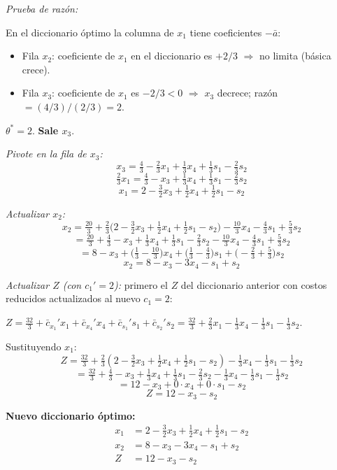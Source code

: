 \documentclass{article}
\begin{document}
\begin{enumerate}[a)]
\textit{Prueba de razón:}

En el diccionario óptimo la columna de $x_1$ tiene coeficientes $-\bar{a}$:
\begin{itemize}
  \item Fila $x_2$: coeficiente de $x_1$ en el diccionario es $+2/3$ $\Rightarrow$ no limita (básica crece).
  \item Fila $x_3$: coeficiente de $x_1$ es $-2/3<0$ $\Rightarrow$ $x_3$ decrece; razón $=(4/3)/(2/3)=2$.
\end{itemize}

$\theta^*=2$. \textbf{Sale $x_3$}.

\textit{Pivote en la fila de $x_3$:}
$$x_3=\tfrac{4}{3}-\tfrac{2}{3}x_1+\tfrac{1}{3}x_4+\tfrac{1}{3}s_1-\tfrac{2}{3}s_2$$
$$\tfrac{2}{3}x_1=\tfrac{4}{3}-x_3+\tfrac{1}{3}x_4+\tfrac{1}{3}s_1-\tfrac{2}{3}s_2$$
$$\boxed{x_1=2-\tfrac{3}{2}x_3+\tfrac{1}{2}x_4+\tfrac{1}{2}s_1-s_2}$$

\textit{Actualizar $x_2$:}
$$x_2=\tfrac{20}{3}+\tfrac{2}{3}\bigl(2-\tfrac{3}{2}x_3+\tfrac{1}{2}x_4+\tfrac{1}{2}s_1-s_2\bigr)-\tfrac{10}{3}x_4-\tfrac{4}{3}s_1+\tfrac{5}{3}s_2$$
$$=\tfrac{20}{3}+\tfrac{4}{3}-x_3+\tfrac{1}{3}x_4+\tfrac{1}{3}s_1-\tfrac{2}{3}s_2-\tfrac{10}{3}x_4-\tfrac{4}{3}s_1+\tfrac{5}{3}s_2$$
$$=8-x_3+\bigl(\tfrac{1}{3}-\tfrac{10}{3}\bigr)x_4+\bigl(\tfrac{1}{3}-\tfrac{4}{3}\bigr)s_1+\bigl(-\tfrac{2}{3}+\tfrac{5}{3}\bigr)s_2$$
$$\boxed{x_2=8-x_3-3x_4-s_1+s_2}$$

\textit{Actualizar $Z$ (con $c_1'=2$):} primero el $Z$ del diccionario anterior con costos reducidos actualizados al nuevo $c_1=2$:

$Z=\tfrac{32}{3}+\bar{c}_{x_1}'x_1+\bar{c}_{x_4}'x_4+\bar{c}_{s_1}'s_1+\bar{c}_{s_2}'s_2=\tfrac{32}{3}+\tfrac{2}{3}x_1-\tfrac{1}{3}x_4-\tfrac{1}{3}s_1-\tfrac{1}{3}s_2$.

Sustituyendo $x_1$:
$$Z=\tfrac{32}{3}+\tfrac{2}{3}(2-\tfrac{3}{2}x_3+\tfrac{1}{2}x_4+\tfrac{1}{2}s_1-s_2)-\tfrac{1}{3}x_4-\tfrac{1}{3}s_1-\tfrac{1}{3}s_2$$
$$=\tfrac{32}{3}+\tfrac{4}{3}-x_3+\tfrac{1}{3}x_4+\tfrac{1}{3}s_1-\tfrac{2}{3}s_2-\tfrac{1}{3}x_4-\tfrac{1}{3}s_1-\tfrac{1}{3}s_2$$
$$=12-x_3+0\cdot x_4+0\cdot s_1-s_2$$
$$\boxed{Z=12-x_3-s_2}$$

\textbf{Nuevo diccionario óptimo:}
$$\begin{aligned}
x_1 &= 2 - \tfrac{3}{2}x_3 + \tfrac{1}{2}x_4 + \tfrac{1}{2}s_1 - s_2 \\
x_2 &= 8 - x_3 - 3x_4 - s_1 + s_2 \\
Z   &= 12 - x_3 - s_2
\end{aligned}$$


\end{enumerate}
\end{document}
